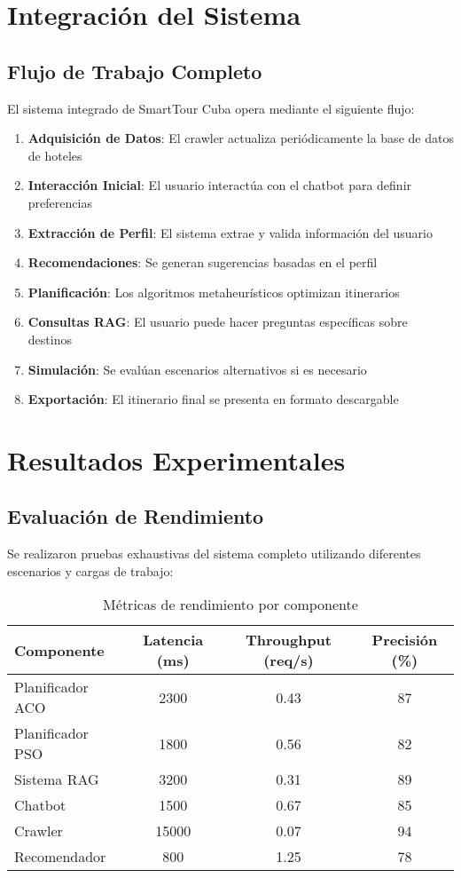 \documentclass[runningheads]{llncs}
\begin{document}
\section{Integración del Sistema}

\subsection{Flujo de Trabajo Completo}

El sistema integrado de SmartTour Cuba opera mediante el siguiente flujo:

\begin{enumerate}
\item \textbf{Adquisición de Datos}: El crawler actualiza periódicamente la base de datos de hoteles
\item \textbf{Interacción Inicial}: El usuario interactúa con el chatbot para definir preferencias
\item \textbf{Extracción de Perfil}: El sistema extrae y valida información del usuario
\item \textbf{Recomendaciones}: Se generan sugerencias basadas en el perfil
\item \textbf{Planificación}: Los algoritmos metaheurísticos optimizan itinerarios
\item \textbf{Consultas RAG}: El usuario puede hacer preguntas específicas sobre destinos
\item \textbf{Simulación}: Se evalúan escenarios alternativos si es necesario
\item \textbf{Exportación}: El itinerario final se presenta en formato descargable
\end{enumerate}


\section{Resultados Experimentales}

\subsection{Evaluación de Rendimiento}

Se realizaron pruebas exhaustivas del sistema completo utilizando diferentes escenarios y cargas de trabajo:

\begin{table}[H]
\centering
\begin{tabular}{lccc}
\toprule
\textbf{Componente} & \textbf{Latencia (ms)} & \textbf{Throughput (req/s)} & \textbf{Precisión (\%)} \\
\midrule
Planificador ACO & 2300 & 0.43 & 87 \\
Planificador PSO & 1800 & 0.56 & 82 \\
Sistema RAG & 3200 & 0.31 & 89 \\
Chatbot & 1500 & 0.67 & 85 \\
Crawler & 15000 & 0.07 & 94 \\
Recomendador & 800 & 1.25 & 78 \\
\bottomrule
\end{tabular}
\caption{Métricas de rendimiento por componente}
\end{table}
\end{document}
